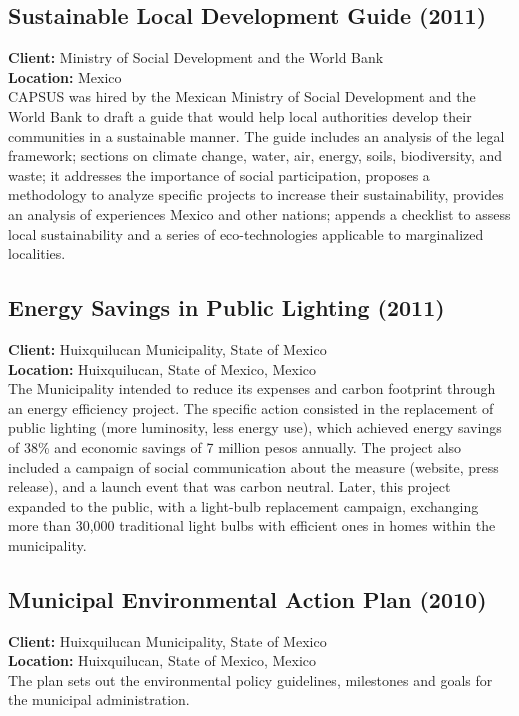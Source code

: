 \documentclass[
	a4paper,
	12pt,
	unnumberedsections,
]{CSSullivanBusinessReport}
\begin{document}
\subsection{Sustainable Local Development Guide (2011)}
\textbf{Client:}  Ministry of Social Development and the World Bank \\
\textbf{Location:}  Mexico \\[0.5em]
 CAPSUS was hired by the Mexican Ministry of Social Development and the World Bank to draft a guide that would help local authorities develop their communities in a sustainable manner. The guide includes an analysis of the legal framework; sections on climate change, water, air, energy, soils, biodiversity, and waste; it addresses the importance of social participation, proposes a methodology to analyze specific projects to increase their sustainability, provides an analysis of experiences Mexico and other nations; appends a checklist to assess local sustainability and a series of eco-technologies applicable to marginalized localities.

\subsection{Energy Savings in Public Lighting (2011)}
\textbf{Client:}  Huixquilucan Municipality, State of Mexico \\
\textbf{Location:}  Huixquilucan, State of Mexico, Mexico \\[0.5em]
 The Municipality intended to reduce its expenses and carbon footprint through an energy efficiency project. The specific action consisted in the replacement of public lighting (more luminosity, less energy use), which achieved energy savings of 38\% and economic savings of 7 million pesos annually. The project also included a campaign of social communication about the measure (website, press release), and a launch event that was carbon neutral. Later, this project expanded to the public, with a light-bulb replacement campaign, exchanging more than 30,000 traditional light bulbs with efficient ones in homes within the municipality.

\subsection{Municipal Environmental Action Plan (2010)}
\textbf{Client:}  Huixquilucan Municipality, State of Mexico \\
\textbf{Location:}  Huixquilucan, State of Mexico, Mexico \\[0.5em]
 The plan sets out the environmental policy guidelines, milestones and goals for the municipal administration.
\end{document}
